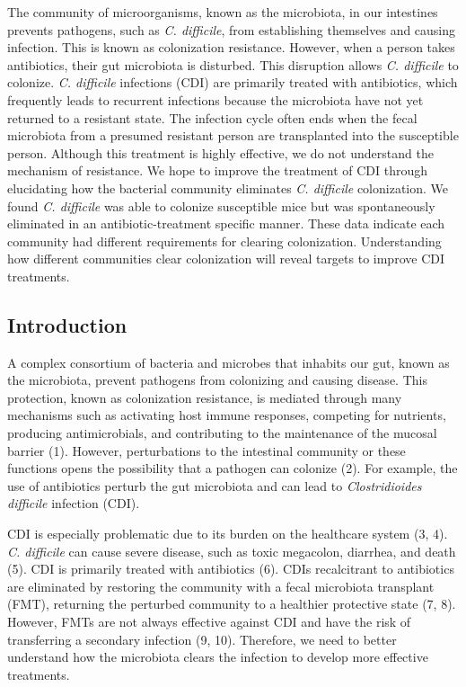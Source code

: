 \documentclass[11pt,]{article}
\begin{document}
The community of microorganisms, known as the microbiota, in our
intestines prevents pathogens, such as \emph{C. difficile}, from
establishing themselves and causing infection. This is known as
colonization resistance. However, when a person takes antibiotics, their
gut microbiota is disturbed. This disruption allows \emph{C. difficile}
to colonize. \emph{C. difficile} infections (CDI) are primarily treated
with antibiotics, which frequently leads to recurrent infections because
the microbiota have not yet returned to a resistant state. The infection
cycle often ends when the fecal microbiota from a presumed resistant
person are transplanted into the susceptible person. Although this
treatment is highly effective, we do not understand the mechanism of
resistance. We hope to improve the treatment of CDI through elucidating
how the bacterial community eliminates \emph{C. difficile} colonization.
We found \emph{C. difficile} was able to colonize susceptible mice but
was spontaneously eliminated in an antibiotic-treatment specific manner.
These data indicate each community had different requirements for
clearing colonization. Understanding how different communities clear
colonization will reveal targets to improve CDI treatments.

\newpage

\hypertarget{introduction}{%
\subsection{Introduction}\label{introduction}}

A complex consortium of bacteria and microbes that inhabits our gut,
known as the microbiota, prevent pathogens from colonizing and causing
disease. This protection, known as colonization resistance, is mediated
through many mechanisms such as activating host immune responses,
competing for nutrients, producing antimicrobials, and contributing to
the maintenance of the mucosal barrier (1). However, perturbations to
the intestinal community or these functions opens the possibility that a
pathogen can colonize (2). For example, the use of antibiotics perturb
the gut microbiota and can lead to \emph{Clostridioides difficile}
infection (CDI).

CDI is especially problematic due to its burden on the healthcare system
(3, 4). \emph{C. difficile} can cause severe disease, such as toxic
megacolon, diarrhea, and death (5). CDI is primarily treated with
antibiotics (6). CDIs recalcitrant to antibiotics are eliminated by
restoring the community with a fecal microbiota transplant (FMT),
returning the perturbed community to a healthier protective state (7,
8). However, FMTs are not always effective against CDI and have the risk
of transferring a secondary infection (9, 10). Therefore, we need to
better understand how the microbiota clears the infection to develop
more effective treatments.
\end{document}
